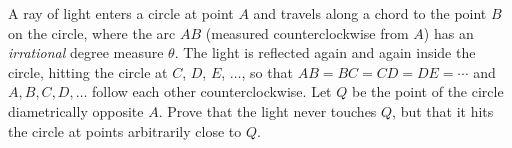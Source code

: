 A ray of light enters a circle at point $A$ and travels along a chord to the point $B$ on the circle, where the arc $AB$ (measured counterclockwise from $A$) has an \emph{irrational} degree measure $\theta$. The light is reflected again and again inside the circle, hitting the circle at $C$, $D$, $E$, $\dots$, so that $AB=BC=CD=DE=\cdots$ and $A,B,C,D,\dots$ follow each other counterclockwise. Let $Q$ be the point of the circle diametrically opposite $A$. Prove that the light never touches $Q$, but that it hits the circle at points arbitrarily close to $Q$.
